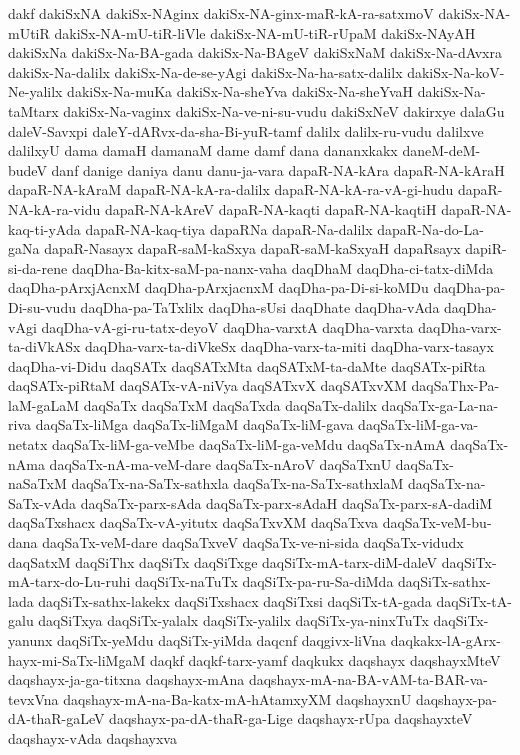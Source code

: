 {dakf
dakiSxNA
dakiSx-NAginx
dakiSx-NA-ginx-maR-kA-ra-satxmoV
dakiSx-NA-mUtiR
dakiSx-NA-mU-tiR-liVle
dakiSx-NA-mU-tiR-rUpaM
dakiSx-NAyAH
dakiSxNa
dakiSx-Na-BA-gada
dakiSx-Na-BAgeV
dakiSxNaM
dakiSx-Na-dAvxra
dakiSx-Na-dalilx
dakiSx-Na-de-se-yAgi
dakiSx-Na-ha-satx-dalilx
dakiSx-Na-koV-Ne-yalilx
dakiSx-Na-muKa
dakiSx-Na-sheYva
dakiSx-Na-sheYvaH
dakiSx-Na-taMtarx
dakiSx-Na-vaginx
dakiSx-Na-ve-ni-su-vudu
dakiSxNeV
dakirxye
dalaGu
daleV-Savxpi
daleY-dARvx-da-sha-Bi-yuR-tamf
dalilx
dalilx-ru-vudu
dalilxve
dalilxyU
dama
damaH
damanaM
dame
damf
dana
dananxkakx
daneM-deM-budeV
danf
danige
daniya
danu
danu-ja-vara
dapaR-NA-kAra
dapaR-NA-kAraH
dapaR-NA-kAraM
dapaR-NA-kA-ra-dalilx
dapaR-NA-kA-ra-vA-gi-hudu
dapaR-NA-kA-ra-vidu
dapaR-NA-kAreV
dapaR-NA-kaqti
dapaR-NA-kaqtiH
dapaR-NA-kaq-ti-yAda
dapaR-NA-kaq-tiya
dapaRNa
dapaR-Na-dalilx
dapaR-Na-do-La-gaNa
dapaR-Nasayx
dapaR-saM-kaSxya
dapaR-saM-kaSxyaH
dapaRsayx
dapiR-si-da-rene
daqDha-Ba-kitx-saM-pa-nanx-vaha
daqDhaM
daqDha-ci-tatx-diMda
daqDha-pArxjAcnxM
daqDha-pArxjacnxM
daqDha-pa-Di-si-koMDu
daqDha-pa-Di-su-vudu
daqDha-pa-TaTxlilx
daqDha-sUsi
daqDhate
daqDha-vAda
daqDha-vAgi
daqDha-vA-gi-ru-tatx-deyoV
daqDha-varxtA
daqDha-varxta
daqDha-varx-ta-diVkASx
daqDha-varx-ta-diVkeSx
daqDha-varx-ta-miti
daqDha-varx-tasayx
daqDha-vi-Didu
daqSATx
daqSATxMta
daqSATxM-ta-daMte
daqSATx-piRta
daqSATx-piRtaM
daqSATx-vA-niVya
daqSATxvX
daqSATxvXM
daqSaThx-Pa-laM-gaLaM
daqSaTx
daqSaTxM
daqSaTxda
daqSaTx-dalilx
daqSaTx-ga-La-na-riva
daqSaTx-liMga
daqSaTx-liMgaM
daqSaTx-liM-gava
daqSaTx-liM-ga-va-netatx
daqSaTx-liM-ga-veMbe
daqSaTx-liM-ga-veMdu
daqSaTx-nAmA
daqSaTx-nAma
daqSaTx-nA-ma-veM-dare
daqSaTx-nAroV
daqSaTxnU
daqSaTx-naSaTxM
daqSaTx-na-SaTx-sathxla
daqSaTx-na-SaTx-sathxlaM
daqSaTx-na-SaTx-vAda
daqSaTx-parx-sAda
daqSaTx-parx-sAdaH
daqSaTx-parx-sA-dadiM
daqSaTxshacx
daqSaTx-vA-yitutx
daqSaTxvXM
daqSaTxva
daqSaTx-veM-bu-dana
daqSaTx-veM-dare
daqSaTxveV
daqSaTx-ve-ni-sida
daqSaTx-vidudx
daqSatxM
daqSiThx
daqSiTx
daqSiTxge
daqSiTx-mA-tarx-diM-daleV
daqSiTx-mA-tarx-do-Lu-ruhi
daqSiTx-naTuTx
daqSiTx-pa-ru-Sa-diMda
daqSiTx-sathx-lada
daqSiTx-sathx-lakekx
daqSiTxshacx
daqSiTxsi
daqSiTx-tA-gada
daqSiTx-tA-galu
daqSiTxya
daqSiTx-yalalx
daqSiTx-yalilx
daqSiTx-ya-ninxTuTx
daqSiTx-yanunx
daqSiTx-yeMdu
daqSiTx-yiMda
daqcnf
daqgivx-liVna
daqkakx-lA-gArx-hayx-mi-SaTx-liMgaM
daqkf
daqkf-tarx-yamf
daqkukx
daqshayx
daqshayxMteV
daqshayx-ja-ga-titxna
daqshayx-mAna
daqshayx-mA-na-BA-vAM-ta-BAR-va-tevxVna
daqshayx-mA-na-Ba-katx-mA-hAtamxyXM
daqshayxnU
daqshayx-pa-dA-thaR-gaLeV
daqshayx-pa-dA-thaR-ga-Lige
daqshayx-rUpa
daqshayxteV
daqshayx-vAda
daqshayxva
}
